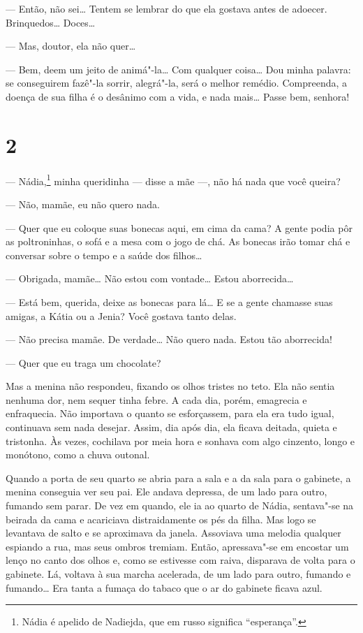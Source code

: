 --- Então, não sei\ldots{} Tentem se lembrar do que ela gostava antes de
adoecer. Brinquedos\ldots{} Doces\ldots{}

--- Mas, doutor, ela não quer\ldots{}

--- Bem, deem um jeito de animá"-la\ldots{} Com qualquer coisa\ldots{} Dou minha
palavra: se conseguirem fazê"-la sorrir, alegrá"-la, será o melhor
remédio. Compreenda, a doença de sua filha é o desânimo com a vida, e
nada mais\ldots{} Passe bem, senhora!

\section{2}

--- Nádia,\footnote{Nádia é apelido de Nadiejda, que em russo
  significa ``esperança''.} minha queridinha --- disse a mãe ---, não há
nada que você queira?

--- Não, mamãe, eu não quero nada.

--- Quer que eu coloque suas bonecas aqui, em cima da cama? A gente
podia pôr as poltroninhas, o sofá e a mesa com o jogo de chá. As
bonecas irão tomar chá e conversar sobre o tempo e a saúde dos filhos\ldots{}

--- Obrigada, mamãe\ldots{} Não estou com vontade\ldots{} Estou aborrecida\ldots{}

--- Está bem, querida, deixe as bonecas para lá\ldots{} E se a gente chamasse
suas amigas, a Kátia ou a Jenia? Você gostava tanto delas.

--- Não precisa mamãe. De verdade\ldots{} Não quero nada. Estou tão
aborrecida!

--- Quer que eu traga um chocolate?

Mas a menina não respondeu, fixando os olhos tristes no teto. Ela não
sentia nenhuma dor, nem sequer tinha febre. A cada dia, porém, emagrecia
e enfraquecia. Não importava o quanto se esforçassem, para ela era tudo
igual, continuava sem nada desejar. Assim, dia após dia, ela ficava
deitada, quieta e tristonha. Às vezes, cochilava por meia hora e sonhava com algo cinzento, longo e monótono, como a chuva outonal.

Quando a porta de seu quarto se abria para a sala e a da sala para o
gabinete, a menina conseguia ver seu pai. Ele andava depressa, de um
lado para outro, fumando sem parar. De vez em quando, ele ia ao quarto
de Nádia, sentava"-se na beirada da cama e acariciava distraidamente os
pés da filha. Mas logo se levantava de salto e se aproximava da janela.
Assoviava uma melodia qualquer espiando a rua, mas seus ombros
tremiam. Então, apressava"-se em encostar um lenço no canto dos olhos e,
como se estivesse com raiva, disparava de volta para o gabinete. Lá,
voltava à sua marcha acelerada, de um lado para outro, fumando e
fumando\ldots{} Era tanta a fumaça do tabaco que o ar do gabinete ficava azul.

